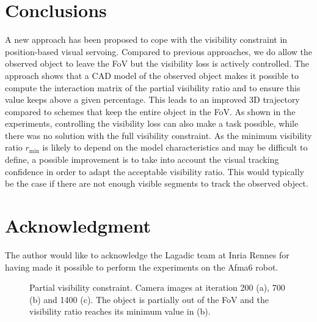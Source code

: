 \documentclass[letterpaper, 10 pt, conference]{IEEEtran}  %
\begin{document}
\section{Conclusions}

A new approach has been proposed to cope with the visibility constraint in position-based visual servoing.
Compared to previous approaches, we do allow the observed object to leave the FoV but the visibility loss is actively controlled.
The approach shows that a CAD model of the observed object makes it possible to compute the interaction matrix of the partial visibility ratio and to ensure this value keeps above a given percentage.
This leads to an improved 3D trajectory compared to schemes that keep the entire object in the FoV. As shown in the experiments, 
controlling the visibility loss can also make a task possible, while there was no solution with the full visibility constraint.
As the minimum visibility ratio $r_\text{min}$ is likely to depend on the model characteristics and may be difficult to define, a possible improvement is to take into account the visual tracking confidence in order to adapt the acceptable visibility ratio. This would typically be the case if there are not enough visible segments to track the observed object.


\section{Acknowledgment}

The author would like to acknowledge the Lagadic team at Inria Rennes for having made it possible to perform the experiments on the Afma6 robot.


\begin{figure*}
\hfill
{}\hfill
{}
\caption{Partial visibility constraint. Camera images at iteration 200 (a), 700 (b) and 1400 (c). The object is partially out of the FoV and the visibility ratio reaches its minimum value in (b).}
\label{fig:part2}
\end{figure*}
\end{document}
